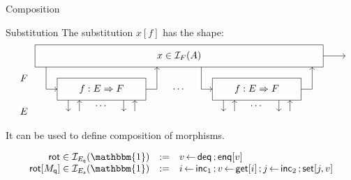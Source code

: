 \documentclass[aspectratio=141]{beamer}
\newcommand{\kw}[1]{\ensuremath{ \mathsf{#1} }}
\begin{document}
\begin{frame}{Composition} %
  \begin{block}{Substitution}
    The substitution $x[f]$ has the shape:
    \[
    \begin{tikzpicture}[scale=0.4]
      \draw[->] (13, 3) -- (15, 3);
      \draw (-13, 2) rectangle (13, 4);
      \node at (0, 3) {$x \in \mathcal{I}_F(A)$};
      \begin{scope}[xshift=-7cm]
        \draw (-4,-1) rectangle (4,1);
        \draw[->] (-5, 2) |- (-4,0);
        \draw[->] (4,0) -| (5,2);
        \node (f) at (0,0) {$f : E \Rightarrow F$};
        \draw[->] (-3, -1) -- (-3, -2);
        \draw[->] (-2, -2) -- (-2, -1);
        \node[below] at (0, -1) {$\cdots$};
        \draw[->] (2, -1) -- (2, -2);
        \draw[->] (3, -2) -- (3, -1);
      \end{scope}
      \node at (0, 0) {$\cdots$};
      \begin{scope}[xshift=7cm]
        \draw (-4,-1) rectangle (4,1);
        \draw[->] (-5, 2) |- (-4,0);
        \draw[->] (4,0) -| (5,2);
        \node (f) at (0,0) {$f : E \Rightarrow F$};
        \draw[->] (-3, -1) -- (-3, -2);
        \draw[->] (-2, -2) -- (-2, -1);
        \node[below] at (0, -1) {$\cdots$};
        \draw[->] (2, -1) -- (2, -2);
        \draw[->] (3, -2) -- (3, -1);
      \end{scope}
      \node at (-14,  1) {$F$};
      \node at (-14, -2) {$E$};
    \end{tikzpicture}
    \]
    It can be used to define composition of morphisms.
  \end{block}
  \pause
  \begin{example}
    \vspace{-1em}
    \[ \begin{array}{r@{{} \in {}}c@{\quad := \quad}l}
      \kw{rot} & \mathcal{I}_{E_\kw{q}}(\mathbbm{1}) &
        v \mathop{\leftarrow} \kw{deq} \mathop{;} \kw{enq}[v] \\
      \kw{rot}[M_\kw{q}] & \mathcal{I}_{E_\kw{a}}(\mathbbm{1}) &
        i \mathop{\leftarrow} \kw{inc}_1 \mathop{;}
        v \mathop{\leftarrow} \kw{get}[i] \mathop{;}
        j \mathop{\leftarrow} \kw{inc}_2 \mathop{;}
        \kw{set}[j, v]
    \end{array} \]
  \end{example}
\end{frame}
\end{document}
